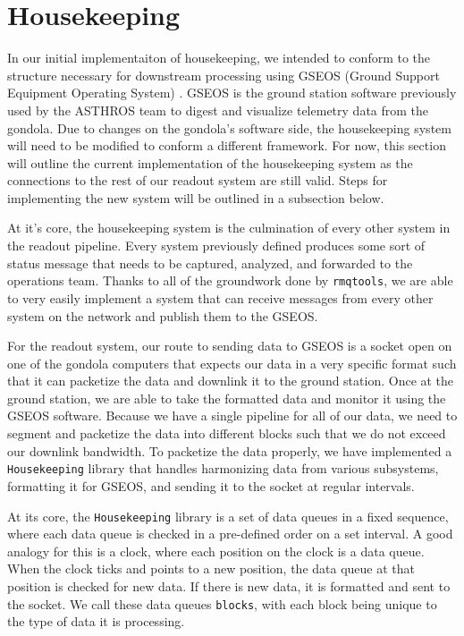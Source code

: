 \section{Housekeeping}
In our initial implementaiton of housekeeping, we intended to conform to the structure necessary for downstream processing using GSEOS (Ground Support Equipment Operating System) \citep{hauck2003use}.
GSEOS is the ground station software previously used by the ASTHROS team to digest and visualize telemetry data from the gondola.
Due to changes on the gondola's software side, the housekeeping system will need to be modified to conform a different framework.
For now, this section will outline the current implementation of the housekeeping system as the connections to the rest of our readout system are still valid. 
Steps for implementing the new system will be outlined in a subsection below.

At it's core, the housekeeping system is the culmination of every other system in the readout pipeline.
Every system previously defined produces some sort of status message that needs to be captured, analyzed, and forwarded to the operations team.
Thanks to all of the groundwork done by \texttt{rmqtools}, we are able to very easily implement a system that can receive messages from every other system on the network and publish them to the GSEOS. 

For the readout system, our route to sending data to GSEOS is a socket open on one of the gondola computers that expects our data in a very specific format such that it can packetize the data and downlink it to the ground station.
Once at the ground station, we are able to take the formatted data and monitor it using the GSEOS software.
Because we have a single pipeline for all of our data, we need to segment and packetize the data into different blocks such that we do not exceed our downlink bandwidth.
To packetize the data properly, we have implemented a \texttt{Housekeeping} library that handles harmonizing data from various subsystems, formatting it for GSEOS, and sending it to the socket at regular intervals. 

At its core, the \texttt{Housekeeping} library is a set of data queues in a fixed sequence, where each data queue is checked in a pre-defined order on a set interval.
A good analogy for this is a clock, where each position on the clock is a data queue.
When the clock ticks and points to a new position, the data queue at that position is checked for new data.
If there is new data, it is formatted and sent to the socket.
We call these data queues \texttt{blocks}, with each block being unique to the type of data it is processing.

